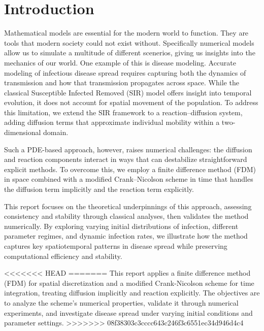 \section{Introduction}
Mathematical models are essential for the modern world to function. They are tools that modern society could not 
exist without. Specifically numerical models allow us to simulate a multitude of different scenerios, giving us 
insights into the mechanics of our world. One example of this is disease modeling. Accurate modeling of infectious disease spread requires capturing both the dynamics of transmission and how that
transmission propagates across space. While the classical Susceptible Infected Removed (SIR) model offers 
insight into temporal evolution, it does not account for spatial movement of the population. To address 
this limitation, we extend the SIR framework to a reaction--diffusion system, adding diffusion terms that 
approximate individual mobility within a two-dimensional domain. 

Such a PDE-based approach, however, raises numerical challenges: the diffusion and reaction components 
interact in ways that can destabilize straightforward explicit methods. To overcome this, 
we employ a finite difference method (FDM) in space combined with a modified Crank--Nicolson scheme in 
time that handles the diffusion term implicitly and the reaction term explicitly. 

This report focuses on the theoretical underpinnings of this approach, assessing consistency and stability 
through classical analyses, then validates the method numerically. By exploring varying initial distributions 
of infection, different parameter regimes, and dynamic infection rates, we illustrate how the method captures 
key spatiotemporal patterns in disease spread while preserving computational efficiency and stability.




<<<<<<< HEAD
=======
This report applies a finite difference method (FDM) for spatial discretization and a modified Crank-Nicolson 
scheme for time integration, treating diffusion implicitly and reaction explicitly. The objectives are to 
analyze the scheme's numerical properties, validate it through numerical experiments, and investigate disease 
spread under varying initial conditions and parameter settings.
>>>>>>> 08f38303c3cccc643c246f3c6551ec34d946d4c4
